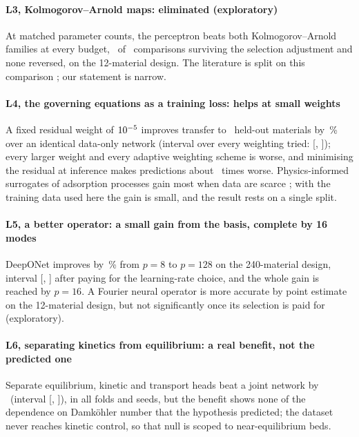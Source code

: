 \paragraph{L3, Kolmogorov--Arnold maps: eliminated (exploratory)} At matched parameter counts,
the perceptron beats both Kolmogorov--Arnold \cite{liu2025kan} families at every budget,
\nLthreeSigSim\ of \nLthreePairs\ comparisons surviving the selection adjustment and none
reversed, on the 12-material design. The literature is split on this comparison
\cite{shukla2024comprehensive,wang2025kinn,rigas2026training}; our statement is narrow.

\paragraph{L4, the governing equations as a training loss: helps at small weights} A fixed
residual weight of \(10^{-5}\) improves transfer to \nLfourbMatNmat\
held-out materials by \nLfourbMatGainPct\,\% over an identical data-only network (interval
over every weighting tried: [\nLfourbMatSelLo, \nLfourbMatSelHi]); every larger weight and
every adaptive weighting scheme is worse, and minimising the residual at inference makes
predictions about \nLfourbRefTwinFactor\ times worse. Physics-informed surrogates of
adsorption processes gain most when data are scarce \cite{galanti2025towards}; with the
training data used here the gain is small, and the result rests on a single split.

\paragraph{L5, a better operator: a small gain from the basis, complete by 16 modes}
DeepONet improves by \nLfiveVtwoGainPct\,\% from \(p = 8\) to \(p = 128\) on the 240-material
design, interval [\nLfiveVtwoSelLo, \nLfiveVtwoSelHi] after paying for the learning-rate
choice, and the whole gain is reached by \(p = 16\). A Fourier neural operator
\cite{li2021fourier} is more accurate by point estimate on the 12-material design, but not
significantly once its selection is paid for (exploratory).

\paragraph{L6, separating kinetics from equilibrium: a real benefit, not the predicted one}
Separate equilibrium, kinetic and transport heads beat a joint network by \nLsixDiff\
(interval [\nLsixLo, \nLsixHi]), in all folds and seeds, but the benefit shows none of the
dependence on Damk\"ohler number that the hypothesis predicted; the dataset never
reaches kinetic control, so that null is scoped to near-equilibrium beds.

